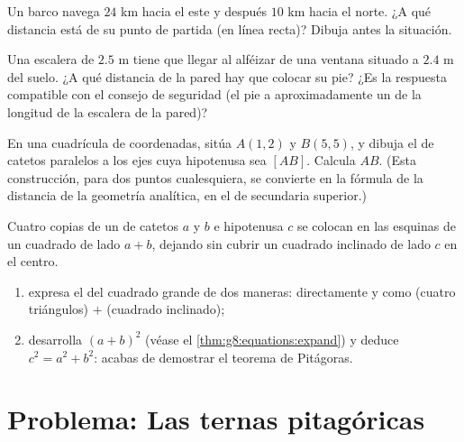 \begin{exercise}[$\star\star$]\label{exo:g8:pythagoras:8}
Un barco navega $24$ km hacia el este y después $10$ km hacia el norte. ¿A qué distancia está de su
punto de partida (en línea recta)? Dibuja antes la situación.
\end{exercise}

\begin{exercise}[$\star\star$]\label{exo:g8:pythagoras:9}
Una escalera de $2.5$ m tiene que llegar al alféizar de una ventana situado a $2.4$ m del suelo.
¿A qué distancia de la pared hay que colocar su pie? ¿Es la respuesta
compatible con el consejo de seguridad (el pie a aproximadamente un  de la longitud
de la escalera de la pared)?
\end{exercise}

\begin{exercise}[$\star\star$]\label{exo:g8:pythagoras:10}
En una cuadrícula de coordenadas, sitúa $A(1, 2)$ y $B(5, 5)$, y dibuja el
 de catetos paralelos a los ejes cuya hipotenusa sea
$[AB]$. Calcula $AB$. (Esta construcción, para dos puntos cualesquiera, se convierte en
la fórmula de la distancia de la geometría analítica, en el  de secundaria
superior.)
\end{exercise}

\begin{exercise}[$\star\star\star$]\label{exo:g8:pythagoras:11}
Cuatro copias de un  de catetos $a$ y $b$ e hipotenusa $c$
se colocan en las esquinas de un cuadrado de lado $a + b$, dejando sin cubrir
un cuadrado inclinado de lado $c$ en el centro.
\begin{enumerate}
  \item expresa el  del cuadrado grande de dos maneras: directamente y
        como (cuatro triángulos) $+$ (cuadrado inclinado);
  \item desarrolla $(a + b)^2$ (véase el \cref{thm:g8:equations:expand}) y
        deduce $c^2 = a^2 + b^2$: acabas de demostrar el teorema
        de Pitágoras.
\end{enumerate}
\end{exercise}

\section{Problema: Las ternas pitagóricas}

